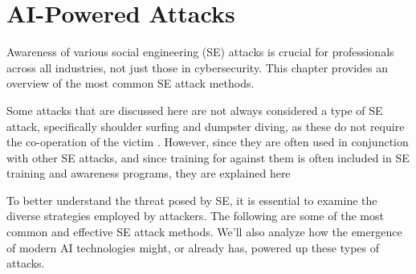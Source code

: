 


\chapter{AI-Powered Attacks\label{attacks}}
\begin{comment}

Guides:
    - About 3-4 pages

TODO:
    [ ] 

What to cover:
    - Attacks
        - Deepfake generated synthetic media
            - Videos
            - Images
            - Audio
            - Real-time voice morphing
    
Literature:
    - 

\end{comment}

Awareness of various social engineering (SE) attacks is crucial for professionals across all industries, not just those in cybersecurity. This chapter provides an overview of the most common SE attack methods. 


Some attacks that are discussed here are not always considered a type of SE attack, specifically shoulder surfing and dumpster diving, as these do not require the co-operation of the victim \citep{wang_defining_2020}. However, since they are often used in conjunction with other SE attacks, and since training for against them is often included in SE training and awareness programs, they are explained here


To better understand the threat posed by SE, it is essential to examine the diverse strategies employed by attackers. The following are some of the most common and effective SE attack methods. We'll also analyze how the emergence of modern AI technologies might, or already has, powered up these types of attacks.

